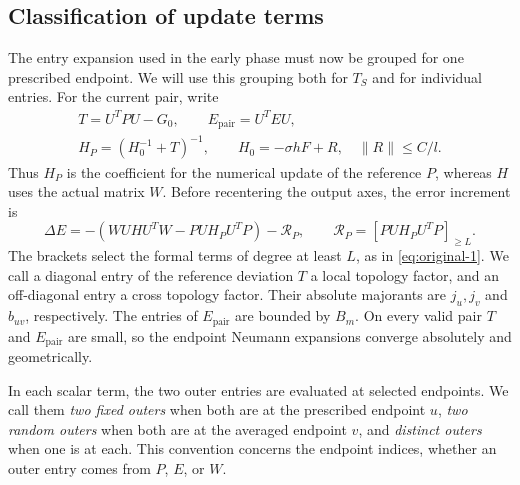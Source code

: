 \subsection{Classification of update terms}

The entry expansion used in the early phase must now be grouped for
one prescribed endpoint.  We will use this grouping both for $T_S$
and for individual entries.  For the current pair, write
\[
 \begin{gathered}
 T=U^TPU-G_0,\qquad E_{\mathrm{pair}}=U^TEU,\\
 H_P=(H_0^{-1}+T)^{-1},\qquad
 H_0=-\sigma hF+R,\quad \|R\|\leq C/l.
 \end{gathered}
\]
Thus $H_P$ is the coefficient for the numerical update of the reference
$P$, whereas $H$ uses the actual matrix $W$.  Before recentering the
output axes, the error increment is
\[
 \Delta E=-(WUHU^TW-PUH_PU^TP)-\mathcal R_P,
 \qquad \mathcal R_P=[PUH_PU^TP]_{\ge L}.
\]
The brackets select the formal terms of degree at least $L$, as in
\eqref{eq:original-1}.  We call a diagonal entry of the reference
deviation $T$ a local topology factor, and an off-diagonal entry a
cross topology factor.  Their absolute majorants are $j_u,j_v$ and
$b_{uv}$, respectively.  The entries of $E_{\mathrm{pair}}$ are
bounded by $B_m$.
On every valid pair $T$ and $E_{\mathrm{pair}}$ are small, so the
endpoint Neumann expansions converge absolutely and geometrically.

In each scalar term, the two outer entries are evaluated at selected
endpoints.  We call them \emph{two fixed outers} when both are at the
prescribed endpoint $u$, \emph{two random outers} when both are at the
averaged endpoint $v$, and \emph{distinct outers} when one is at each.
This convention concerns the endpoint indices, whether an outer entry
comes from $P$, $E$, or $W$.

